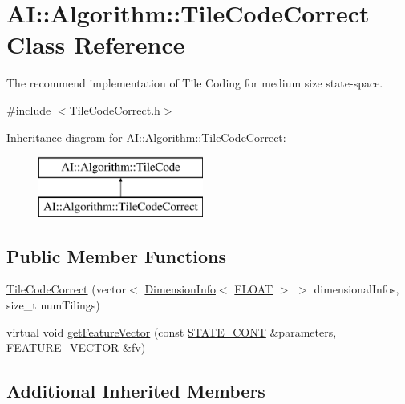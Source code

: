 \hypertarget{classAI_1_1Algorithm_1_1TileCodeCorrect}{\section{A\+I\+:\+:Algorithm\+:\+:Tile\+Code\+Correct Class Reference}
\label{classAI_1_1Algorithm_1_1TileCodeCorrect}
}


The recommend implementation of Tile Coding for medium size state-\/space.  




{\ttfamily \#include $<$Tile\+Code\+Correct.\+h$>$}

Inheritance diagram for A\+I\+:\+:Algorithm\+:\+:Tile\+Code\+Correct\+:\begin{figure}[H]
\begin{center}
\leavevmode
\includegraphics[height=2.000000cm]{classAI_1_1Algorithm_1_1TileCodeCorrect}
\end{center}
\end{figure}
\subsection*{Public Member Functions}
\begin{DoxyCompactItemize}
\item 
\hyperlink{classAI_1_1Algorithm_1_1TileCodeCorrect_a4347bf107c7d252ce0e080be0e134313}{Tile\+Code\+Correct} (vector$<$ \hyperlink{classAI_1_1Algorithm_1_1DimensionInfo}{Dimension\+Info}$<$ \hyperlink{namespaceAI_a41b74884a20833db653dded3918e05c3}{F\+L\+O\+A\+T} $>$ $>$ dimensional\+Infos, size\+\_\+t num\+Tilings)
\item 
virtual void \hyperlink{classAI_1_1Algorithm_1_1TileCodeCorrect_abb6d45df5a7f6d6263f063586b417eaa}{get\+Feature\+Vector} (const \hyperlink{namespaceAI_aff63ec21d97dd5f086fddbc3103f5707}{S\+T\+A\+T\+E\+\_\+\+C\+O\+N\+T} \&parameters, \hyperlink{namespaceAI_a23a39e1b301a5c1345fa508796940631}{F\+E\+A\+T\+U\+R\+E\+\_\+\+V\+E\+C\+T\+O\+R} \&fv)
\end{DoxyCompactItemize}
\subsection*{Additional Inherited Members}


